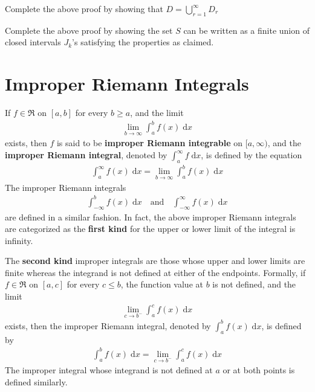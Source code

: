 \documentclass[thmcnt=section, 12pt]{my-elegantbook}
\begin{document}
\begin{exercise} \label{ex:11}
    Complete the above proof by
    showing that $D = \bigcup_{r=1}^\infty D_r$
\end{exercise}

\begin{exercise} \label{ex:12}
    Complete the above proof by showing the set $S$
    can be written as a finite union of closed intervals $J_k$'s
    satisfying the properties as claimed.
\end{exercise}


\section{Improper Riemann Integrals}


\begin{definition} \label{def:10}
    If $f \in \mathfrak{R}$ on $[a, b]$
    for every $b \geq a$,
    and the limit
    \begin{align*}
        \lim_{b \to \infty}
        \int_a^b f(x) \; \mathrm{d}x
    \end{align*}
    exists, then $f$ is said to be \textbf{improper Riemann integrable}
    on $[ a, \infty )$,
    and the \textbf{improper Riemann integral},
    denoted by $\int_a^\infty f \; \mathrm{d} x$, is defined by
    the equation
    \begin{align*}
        \int_a^\infty f(x) \; \mathrm{d} x
        = \lim_{b \to \infty}
        \int_a^b f(x) \; \mathrm{d}x
    \end{align*}
    The improper Riemann integrals
    \begin{align*}
        \int_{-\infty}^b f(x) \; \mathrm{d} x
        \quad \text{and} \quad
        \int_{-\infty}^\infty f(x) \; \mathrm{d} x
    \end{align*}
    are defined in a similar fashion.
    In fact, the above improper Riemann integrals
    are categorized as the \textbf{first kind}
    for the upper or lower limit of the integral
    is infinity.

    The \textbf{second kind} improper integrals
    are those whose
    upper and lower limits are finite whereas the integrand
    is not defined at either of the endpoints.
    Formally, if $f \in \mathfrak{R}$ on $[a, c]$ for every $c \leq b$,
    the function value at $b$ is not defined,
    and the limit
    \begin{align*}
        \lim_{c \to b^{-}} \int_a^c f(x) \; \mathrm{d} x
    \end{align*}
    exists, then the improper Riemann integral,
    denoted by $\int_a^b f(x) \; \mathrm{d} x$,
    is defined by
    \begin{align*}
        \int_a^b f(x) \; \mathrm{d}x
        = \lim_{c \to b^-} \int_a^c f(x) \; \mathrm{d}x
    \end{align*}
    The improper integral whose integrand
    is not defined at $a$ or at both points
    is defined similarly.
\end{definition}
\end{document}
